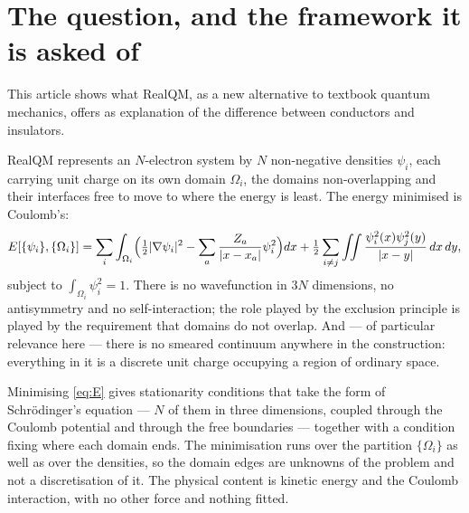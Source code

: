 \documentclass[11pt]{article}
\newcommand{\grad}{\nabla}
\newcommand{\half}{\tfrac12}
\begin{document}
\begin{abstract}
\textbf{The corrugation is the activation energy $E_a$.} It fixes the exponential in the hopping
conductivity, $\sigma\propto\nu\exp(-E_a/kT)$ with $kT$ the thermal energy, so $240$ against
$24$~meV is four orders of magnitude in $\sigma$ at room temperature. The prefactor $\nu$ is an
attempt frequency, a lattice quantity this framework can also supply since it moves nuclei under
classical equations of motion --- though it is not computed here. Metallic conduction is different:
its rate needs a relaxation time from electron--phonon scattering, and that stays outside.
\end{abstract}


\section{The question, and the framework it is asked of}\label{sec:intro}

This article shows what RealQM, as a new alternative to textbook quantum mechanics, offers as
explanation of the difference between conductors and insulators.

RealQM \cite{realqm,realqmbook} represents an $N$-electron system by $N$ non-negative densities
$\psi_i$, each carrying unit charge on its own domain $\Omega_i$, the domains non-overlapping and
their interfaces free to move to where the energy is least. The energy minimised is Coulomb's:
\begin{equation}\label{eq:E}
E[\{\psi_i\},\{\Omega_i\}]=\sum_i\int_{\Omega_i}\Bigl(\half|\grad\psi_i|^2
-\sum_a\frac{Z_a}{|x-x_a|}\psi_i^2\Bigr)dx
+\half\sum_{i\neq j}\iint\frac{\psi_i^2(x)\psi_j^2(y)}{|x-y|}\,dx\,dy,
\end{equation}
subject to $\int_{\Omega_i}\psi_i^2=1$. There is no wavefunction in $3N$ dimensions, no
antisymmetry and no self-interaction; the role played by the exclusion principle is played by the
requirement that domains do not overlap. And --- of particular relevance here --- there is no smeared
continuum anywhere in the construction: everything in it is a discrete unit charge occupying a region
of ordinary space.

Minimising \eqref{eq:E} gives stationarity conditions that take the form of Schr\"odinger's
equation --- $N$ of them in three dimensions, coupled through the Coulomb potential and through the
free boundaries --- together with a condition fixing where each domain ends. The minimisation runs over the
partition $\{\Omega_i\}$ as well as over the densities, so the domain edges are unknowns of the
problem and not a discretisation of it. The physical content is kinetic energy and the Coulomb
interaction, with no other force and nothing fitted.
\end{document}
